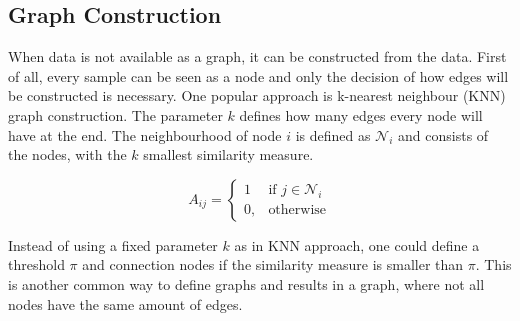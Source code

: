 %
%
%

\subsection{Graph Construction}

When data is not available as a graph, it can be constructed from the data.
First of all, every sample can be seen as a node and only the decision of how edges will be constructed
is necessary. One popular approach is k-nearest neighbour (KNN) graph construction. The parameter $k$
defines how many edges every node will have at the end. The neighbourhood of node $i$ is defined
as $\mathcal{N}_i$ and consists of the nodes, with the $k$ smallest similarity measure.

\begin{equation}
    \label{eg:knn}
    A_{ij} =    
    \begin{cases}
        1  & \text{if } j \in \mathcal{N}_i \\
        0, & \text{otherwise}
    \end{cases}
\end{equation}

Instead of using a fixed parameter $k$ as in KNN approach, one could define a threshold $\pi$
and connection nodes if the similarity measure is smaller than $\pi$. This is another common way
to define graphs and results in a graph, where not all nodes have the same amount of edges.

